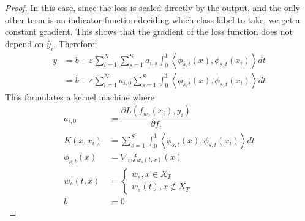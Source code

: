 \begin{proof}

In this case, since the loss is scaled directly by the output, and the only other term is an indicator function deciding which class label to take, we get a constant gradient.
This shows that the gradient of the loss function does not depend on $\hat y_i$. 
Therefore:
\begin{align}
    y &= b - \varepsilon \sum_{i = 1}^{N}\sum_{s = 1}^S a_{i, s}  \int_0^1 \left\langle \phi_{s,t}(x), \phi_{s,t}(x_i)\right\rangle dt\\
     &= b - \varepsilon \sum_{i = 1}^{N} a_{i, 0} \sum_{s = 1}^S  \int_0^1 \left\langle \phi_{s,t}(x), \phi_{s,t}(x_i)\right\rangle dt
\end{align}
This formulates a kernel machine where
\begin{align}
a_{i, 0} &= \dfrac{\partial L(f_{w_0}(x_i),  y_i)}{\partial f_i} \\
K(x, x_i) &= \sum_{s = 1}^S \int_0^1 \left\langle \phi_{s,t}(x), \phi_{s,t}(x_i)\right\rangle dt \\
\phi_{s,t}(x) &=  \nabla_w f_{w_s(t,x)} (x)\\
w_s(t,x) &= \begin{cases} w_s, x \in X_T\\ w_s(t), x \notin X_T \end{cases}\\
b &= 0
\end{align}
\end{proof}

